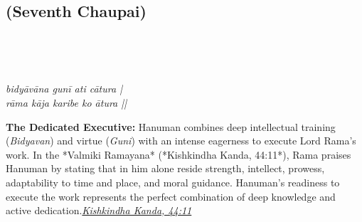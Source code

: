 \subsection*{ (Seventh Chaupai)}

\begin{minipage}[t]{0.55\textwidth}
\vspace{0pt}

{\large \linespread{1.5}\selectfont
{}\\
\par}

\vspace{0.5em}

{\large \linespread{1.5}\selectfont
{}\\
\par}

\vspace{0.5em}

{\large \linespread{1.3}\selectfont
\textit{bidyāvāna gunī ati cātura |}\\
\textit{rāma kāja karibe ko ātura ||}
\par}
\end{minipage}%
\hfill
\begin{minipage}[t]{0.42\textwidth}
\vspace{0pt}
\begin{tcolorbox}[anchorbox]
\textbf{The Dedicated Executive:} Hanuman combines deep intellectual training (\textit{Bidyavan}) and virtue (\textit{Guni}) with an intense eagerness to execute Lord Rama's work. In the *Valmiki Ramayana* (*Kishkindha Kanda, 44:11*), Rama praises Hanuman by stating that in him alone reside strength, intellect, prowess, adaptability to time and place, and moral guidance.
\vspace{0.5em}\newline Hanuman's readiness to execute the work represents the perfect combination of deep knowledge and active dedication.\newline\null\hfill\href{https://www.valmiki.iitk.ac.in/sloka?field_kanda_tid=4&language=dv&field_sarga_value=44}{\textit{Kishkindha Kanda, 44:11}}
\end{tcolorbox}
\end{minipage}

\vspace{0.5em}
